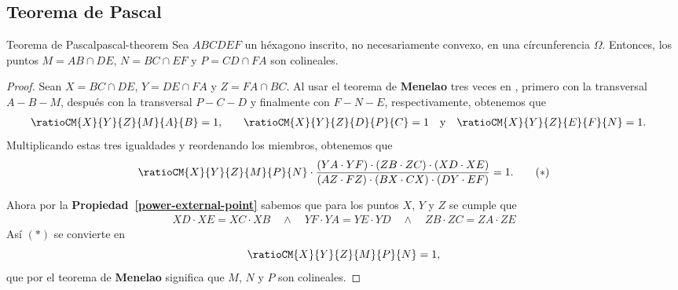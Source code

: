 \subsection{Teorema de Pascal}

\begin{section-theorem.tcb}{Teorema de Pascal}{pascal-theorem}
    Sea $ABCDEF$ un héxagono inscrito, no necesariamente convexo, en una círcunferencia $\Omega$.
    Entonces, los puntos $M = AB \cap DE$, $N = BC \cap EF$ y $P = CD \cap FA$ son colineales.
\end{section-theorem.tcb}

\begin{proof}
    Sean $X = BC \cap DE$, $Y = DE \cap FA$ y $Z = FA \cap BC$.
    Al usar el teorema de \textbf{Menelao} tres veces en , primero con la transversal $A - B - M$, después con la transversal $P - C - D$ y finalmente con $F - N - E$, respectivamente, obtenemos que
    \begin{align*}
        &\ratioCM{X}{Y}{Z}{M}{A}{B} = 1, &&
        &\ratioCM{X}{Y}{Z}{D}{P}{C} = 1 &&\text{y}&&
        &\ratioCM{X}{Y}{Z}{E}{F}{N} = 1.
    \end{align*}
    Multiplicando estas tres igualdades y reordenando los miembros, obtenemos que
    \begin{align*}
        \ratioCM{X}{Y}{Z}{M}{P}{N} \cdot \frac{(YA\cdot YF) \cdot (ZB\cdot ZC) \cdot (XD\cdot XE)}{(AZ\cdot FZ) \cdot (BX \cdot CX) \cdot (DY\cdot EF)} = 1. \tag{$\ast$}
    \end{align*}
    \begin{figure}[H]
        \centering
        
    \end{figure}
    Ahora por la \textbf{Propiedad~\ref{power-external-point}} sabemos que para los puntos $X$, $Y$ y $Z$ se cumple que
    \begin{align*}
        XD \cdot XE = XC \cdot XB \quad \land \quad
        YF \cdot YA = YE \cdot YD \quad \land \quad
        ZB \cdot ZC = ZA \cdot ZE
    \end{align*}
    Así $(\ast)$ se convierte en
    \[
        \ratioCM{X}{Y}{Z}{M}{P}{N} = 1,
    \]
    que por el teorema de \textbf{Menelao} significa que $M$, $N$ y $P$ son colineales.
\end{proof}


